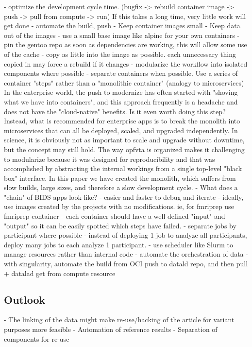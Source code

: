  - optimize the development cycle time.
   (bugfix -> rebuild container image -> push -> pull from compute -> run)
    If this takes a long time, very little work will get done
    - automate the build, push
    - Keep container images small
       - Keep data out of the images
       - use a small base image like alpine for your own containers
    - pin the gentoo repo as soon as dependencies are working, this will allow some use of the cache
    - copy as little into the image as possible. each unnecessary thing copied in may force a rebuild if it changes
  - modularize the workflow into isolated components where possible
    - separate containers when possible. Use a series of container "steps" rather than a "monolithic container" (analogy to microservices)
      In the enterprise world, the push to modernize has often started with "shoving what we have into containers", and this approach frequently is a headache and does not have the "cloud-native" benefits. Is it even worth doing this step?
      Instead, what is recommended for enterprise apps is to break the monolith into microservices that can all be deployed, scaled, and upgraded independently. 
      In science, it is obviously not as important to scale and upgrade without downtime, but the concept may still hold. 
      The way opfvta is organized makes it challenging to modularize because it was designed for reproducibility and that was accomplished by abstracting the internal workings from a single top-level "black box" interface.
      In this paper we have created the monolith, which suffers from slow builds, large sizes, and therefore a slow development cycle. 
    - What does a "chain" of BIDS apps look like?
    - easier and faster to debug and iterate
    - ideally, use images created by the projects with no modifications. ie, for fmriprep use fmriprep container
    - each container should have a well-defined "input" and "output" so it can be easily spotted which steps have failed.
  - separate jobs by participant where possible
    - instead of deploying 1 job to analyze all participants, deploy many jobs to each analyze 1 participant.
    - use scheduler like Slurm to manage resources rather than internal code
 - automate the orchestration of data
 - with singularity, automate the build from OCI push to datald repo, and then pull + datalad get from compute resource

\subsection{Outlook}
- The linking of the data might make re-use/hacking of the article for variant purposes more feasible
- Automation of reference results
- Separation of components for re-use
